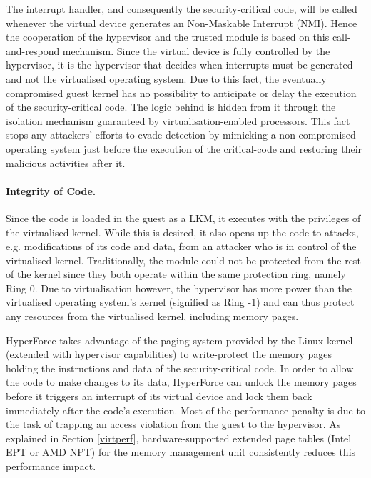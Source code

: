  
The interrupt handler, and consequently the security-critical code, will be called whenever the virtual device generates an Non-Maskable Interrupt (NMI). Hence the cooperation of the hypervisor and the trusted module is based on this call-and-respond mechanism.
Since the virtual device is fully controlled by the hypervisor, it is the hypervisor that decides when interrupts must be generated and not the virtualised operating system. Due to this fact, the eventually compromised guest kernel has no possibility to anticipate or delay the execution of the security-critical code. The logic behind is hidden from it through the isolation mechanism guaranteed by virtualisation-enabled processors.  
This fact stops any attackers' efforts to evade detection by mimicking a non-compromised operating system just before the execution of the critical-code and restoring their malicious activities after it.

\paragraph{Integrity of Code.}
Since the code is loaded in the guest as a LKM, it executes with the privileges of the virtualised kernel. While this is desired, it also opens up the code to attacks, e.g. modifications of its code and data, from an attacker who is in control of the virtualised kernel. 
Traditionally, the module could not be protected from the rest of the kernel since they both operate within the same protection ring, namely Ring 0. 
Due to virtualisation however, the hypervisor has more power than the virtualised operating system's kernel (signified as Ring -1) and can thus protect any resources from the virtualised kernel, including memory pages. 

HyperForce takes advantage of the paging system provided by the Linux kernel (extended with hypervisor capabilities) to write-protect the memory pages holding the instructions and data of the security-critical code. 
In order to allow the code to make changes to its data, HyperForce can unlock the memory pages before it triggers an interrupt of its virtual device and lock them back immediately after the code's execution. 
Most of the performance penalty is due to the task of trapping an access violation from the guest to the hypervisor. As explained in Section \ref{virtperf}, hardware-supported extended page tables (Intel EPT or AMD NPT) for the memory management unit consistently reduces this performance impact.

